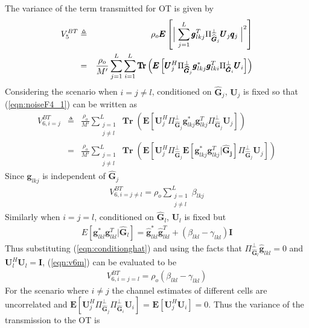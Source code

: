 \documentclass[10pt, a4paper, twoside,fleqn]{article}
\DeclareMathOperator{\Tr}{Tr}
\begin{document}
The variance of the term transmitted for OT is given by
\begin{eqnarray}\label{eqn:noiseF4_1}
	V_5^{BT} &\triangleq& \rho_o\pmb{E}\left[\Bigm|\sum_{j=1}^{L}\pmb{g}_{lkj}^T\Pi^{\perp}_{{\widehat{\pmb{G}}_j}}\pmb{U}_j \pmb{q}_{j}\Bigm|^2\right] \nonumber \\
            &=&       \frac{\rho_o}{M'}\sum_{j=1}^{L}\sum_{i=1}^{L} \pmb{\Tr}\left(\pmb{E}\left[\pmb{U}_j^H \Pi^{\perp}_{\pmb{\widehat{G}}_j} \pmb{g}_{lkj}^* \pmb{g}_{lki}^{T}\Pi^{\perp}_{\pmb{\hat G}_i} \pmb{U}_i \right]\right)
\end{eqnarray}
Considering the scenario when $i=j\neq l$, conditioned on $\pmb{\hat G}_j$, $\pmb{U}_j$ is fixed so that
(\ref{eqn:noiseF4_1}) can be written as 
\begin{eqnarray}\label{eqn:v6m}
V_{6,i=j}^{BT}&\triangleq& \frac{\rho_o}{M'}\sum\limits_{\substack{j=1 \\ j \neq l}}^{L} \pmb{\Tr}\left(\pmb{E}\left[\pmb{U}_j^H \Pi^{\perp}_{\pmb{\widehat{G}}_j} \pmb{g}_{lkj}^* \pmb{g}_{lkj}^{T}\Pi^{\perp}_{\pmb{\hat G}_j} \pmb{U}_j \right]\right) \nonumber \\
           &=& \frac{\rho_o}{M'}\sum_{\substack{j=1 \\ j \neq l}}^{L}\pmb{\Tr}\left(\pmb{E}\left[\pmb{U}_j^H \Pi^{\perp}_{\pmb{\widehat{G}}_j} \pmb{E}[\pmb{g}_{lkj}^* \pmb{g}_{lkj}^{T} | \pmb{\hat G_j}]\Pi^{\perp}_{\pmb{\hat G}_j} \pmb{U}_j \right]\right)
\end{eqnarray}
Since $\pmb{g}_{lkj}$ is independent of $\pmb{\hat G}_j$
\begin{eqnarray}\label{eqn:v6neql}
V_{6,i=j\neq l}^{BT} = \rho_o\sum\limits_{\substack{j=1 \\ j \neq l}}^{L}\beta_{lkj}
\end{eqnarray}
Similarly when $i=j=l$, conditioned on $\pmb{\hat G}_l$, $\pmb{U}_l$ is fixed but
\begin{eqnarray}\label{eqn:conditionghat}
E[\pmb{g}_{lkl}^*\pmb{g}_{lkl}^T|\pmb{\hat G}_l] = \pmb{\hat g}_{lkl}^*\pmb{\hat g}_{lkl}^T + (\beta_{lkl}-\gamma_{lkl})\pmb{I}
\end{eqnarray}
Thus substituting (\ref{eqn:conditionghat}) and using the facts that $\Pi^{\perp}_{\pmb{\hat G}_l}\pmb{\hat g}_{lkl} = 0$ and $\pmb{U}_l^H\pmb{U}_l=\pmb{I}$, (\ref{eqn:v6m}) can be evaluated to be
\begin{eqnarray}\label{eqn:v6l}
V_{6,i=j=l}^{BT}= \rho_o(\beta_{lkl} -\gamma_{lkl})
\end{eqnarray}
For the scenario where $i\neq j$ the channel estimates of different cells are uncorrelated and $\pmb{E}\left[\pmb{U}_j^H\Pi^{\perp}_{\pmb{\widehat{G}}_j}\Pi^{\perp}_{\pmb{\widehat{G}}_i} \pmb{U}_i\right]$ = $\pmb{E}[\pmb{U}_j^H\pmb{U}_i] =0$. Thus the variance of the transmission to the OT is
\end{document}
